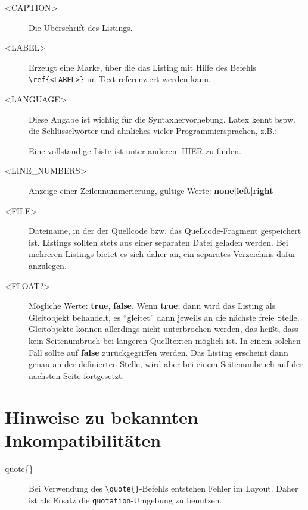 \begin{description}
	\item[<CAPTION>] Die Überschrift des Listings.
	\item[<LABEL>] Erzeugt eine Marke, über die das Listing mit Hilfe des
	Befehls \verb|\ref{<LABEL>}| im Text referenziert werden kann.
	\item[<LANGUAGE>] Diese Angabe ist wichtig für die Syntaxhervorhebung. Latex kennt bspw. die Schlüsselwörter und ähnliches vieler Programmiersprachen, z.B.:
		Eine vollständige Liste ist unter anderem \href{http://en.wikibooks.org/wiki/LaTeX/Packages/Listings}{HIER} zu finden.
	\item[<LINE\_NUMBERS>] Anzeige einer Zeilennummerierung, gültige Werte: {\bfseries none|left|right}
	\item[<FILE>] Dateiname, in der der Quellcode bzw. das Quellcode-Fragment gespeichert ist. Listings sollten stets aus einer separaten Datei geladen werden. Bei mehreren Listings bietet es sich daher an, ein separates Verzeichnis dafür anzulegen.
	\item[<FLOAT?>] Mögliche Werte: \textbf{true}, \textbf{false}. Wenn \textbf{true}, dann wird das Listing als Gleitobjekt behandelt, es "`gleitet"' dann jeweils an die nächste freie Stelle. Gleitobjekte können allerdings nicht unterbrochen werden, das heißt, dass kein Seitenumbruch bei längeren Quelltexten möglich ist. In einem solchen Fall sollte auf \textbf{false} zurückgegriffen werden. Das Listing erscheint dann genau an der definierten Stelle, wird aber bei einem Seitenumbruch auf der nächsten Seite fortgesetzt.
\end{description}

\section{Hinweise zu bekannten Inkompatibilitäten}
\label{sec:Inkompatibilitäten}

\begin{description}
  \item[quote\{\}] Bei Verwendung des
  \verb|\quote{}|-Befehls entstehen Fehler im Layout. Daher ist als Ersatz die \verb|quotation|-Umgebung zu benutzen.
\end{description}

